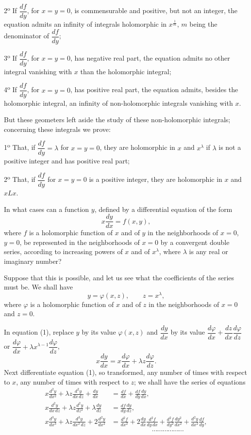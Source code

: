 \documentclass[11pt]{article}
\begin{document}
2\textsuperscript{o} If $\dfrac{df}{dy}$, for $x=y=0$, is commensurable and positive, but not an integer, the equation admits an infinity of integrals holomorphic in $x^{\frac1m}$, $m$ being the denominator of $\dfrac{df}{dy}$;

3\textsuperscript{o} If $\dfrac{df}{dy}$, for $x=y=0$, has negative real part, the equation admits no other integral vanishing with $x$ than the holomorphic integral;

4\textsuperscript{o} If $\dfrac{df}{dy}$, for $x=y=0$, has positive real part, the equation admits, besides the holomorphic integral, an infinity of non-holomorphic integrals vanishing with $x$.

But these geometers left aside the study of these non-holomorphic integrals; concerning these integrals we prove:

1\textsuperscript{o} That, if $\dfrac{df}{dy}=\lambda$ for $x=y=0$, they are holomorphic in $x$ and $x^\lambda$ if $\lambda$ is not a positive integer and has positive real part;

2\textsuperscript{o} That, if $\dfrac{df}{dy}$ for $x=y=0$ is a positive integer, they are holomorphic in $x$ and $xLx$.

In what cases can a function $y$, defined by a differential equation of the form
\begin{equation*}\tag{1}
x\frac{dy}{dx}=f(x,y),
\end{equation*}
where $f$ is a holomorphic function of $x$ and of $y$ in the neighborhoods of $x=0$, $y=0$, be represented in the neighborhoods of $x=0$ by a convergent double series, according to increasing powers of $x$ and of $x^\lambda$, where $\lambda$ is any real or imaginary number?

Suppose that this is possible, and let us see what the coefficients of the series must be. We shall have
\[
y=\varphi(x,z),\qquad z=x^\lambda,
\]
where $\varphi$ is a holomorphic function of $x$ and of $z$ in the neighborhoods of $x=0$ and $z=0$.

In equation (1), replace $y$ by its value $\varphi(x,z)$ and $\dfrac{dy}{dx}$ by its value $\dfrac{d\varphi}{dx}+\dfrac{dz}{dx}\dfrac{d\varphi}{dz}$ or $\dfrac{d\varphi}{dx}+\lambda x^{\lambda-1}\dfrac{d\varphi}{dz}$,
\[
x\frac{dy}{dx}=x\frac{d\varphi}{dx}+\lambda z\frac{d\varphi}{dz}.
\]
Next differentiate equation (1), so transformed, any number of times with respect to $x$, any number of times with respect to $z$; we shall have the series of equations
\begin{align*}
x\frac{d^2y}{dx^2}+\lambda z\frac{d^2y}{dx\,dz}+\frac{dy}{dx}
&=\frac{df}{dx}+\frac{df}{dy}\frac{dy}{dx},\\
x\frac{d^2y}{dx\,dz}+\lambda z\frac{d^2y}{dz^2}+\lambda\frac{dy}{dz}
&=\frac{df}{dy}\frac{dy}{dz},\\
x\frac{d^3y}{dx^3}+\lambda z\frac{d^3y}{dx^2\,dz}+2\frac{d^2y}{dx^2}
&=\frac{d^2f}{dx^2}+2\frac{dy}{dx}\frac{d^2f}{dy\,dx}+\frac{d^2f}{dy^2}\frac{dy^2}{dx^2}+\frac{d^2y}{dx^2}\frac{df}{dy},\\[-0.2em]
&\hspace{6em}\cdots\cdots\cdots\cdots\cdots\cdots
\end{align*}
\end{document}
